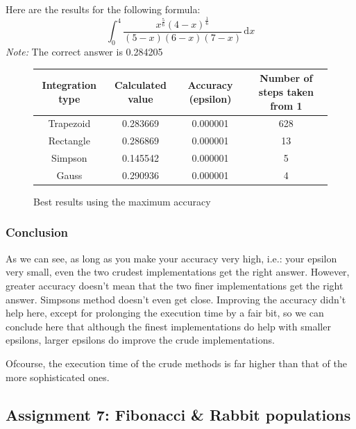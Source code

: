 \documentclass[a4paper,10pt]{article}
\begin{document}
  Here are the results for the following formula: $$\int_0^4 \! \frac{x^{\frac{5}{6}} (4 -
  x)^{\frac{1}{6}}}{(5 - x)(6 - x)(7 - x)} \, \mathrm{d}x$$ \emph{Note:} The correct
  answer is 0.284205

  \begin{figure}[H]
    \begin{tabular}{|c||c|c|c|}
    \hline
    Integration type & Calculated value & Accuracy (epsilon) & Number of
    steps taken from 1 \\
    \hline \hline
    Trapezoid & 0.283669 & 0.000001 & 628 \\
    Rectangle & 0.286869 & 0.000001 & 13 \\
    Simpson & 0.145542 & 0.000001 & 5 \\
    Gauss & 0.290936 & 0.000001 & 4 \\
    \hline
    \end{tabular}
    \caption{Best results using the maximum accuracy}
  \end{figure}

  \subsubsection{Conclusion}
  As we can see, as long as you make your accuracy very high, i.e.: your
  epsilon very small, even the two crudest implementations get the right
  answer. However, greater accuracy doesn't mean that the two finer
  implementations get the right answer. Simpsons method doesn't even
  get close. Improving the accuracy didn't help here, except for
  prolonging the execution time by a fair bit, so we can conclude here
  that although the finest implementations do help with smaller
  epsilons, larger epsilons do improve the crude implementations.

  Ofcourse, the execution time of the crude methods is far higher than
  that of the more sophisticated ones.

  \subsection{Assignment 7: Fibonacci \& Rabbit populations}
\end{document}

